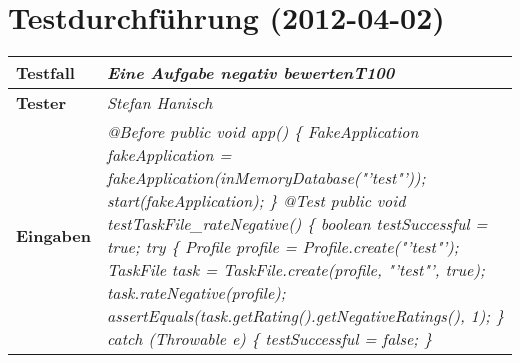 
\chapter{Testdurchführung (2012-04-02)}



\begin{longtable}{|p{4cm}|p{11cm}|}
\hline
\textbf{Testfall} & \textit{Eine Aufgabe negativ bewerten\textbf{T100}} \\
\hline
\textbf{Tester} & \textit{Stefan Hanisch} \\
\hline
\textbf{Eingaben} & \textit{@Before \newline
public void app() \{ \newline
\hspace*{1mm}FakeApplication fakeApplication \newline
\hspace*{4mm}= fakeApplication(inMemoryDatabase("'test"'));\newline
\hspace*{1mm}start(fakeApplication); \newline
\} \newline
\newline
@Test \newline
public void testTaskFile\_rateNegative() \{\newline
\hspace*{1mm}boolean testSuccessful = true; \newline
\hspace*{1mm}try \{\newline
\hspace*{3mm}Profile profile = Profile.create("'test"');\newline
\hspace*{3mm}TaskFile task = TaskFile.create(profile, "'test"', true);\newline
\hspace*{3mm}task.rateNegative(profile);\newline
\hspace*{3mm}assertEquals(task.getRating().getNegativeRatings(), 1);\newline
\hspace*{1mm}\} catch (Throwable e) \{ \newline
\hspace*{3mm}testSuccessful = false; \newline 
\hspace*{1mm}\} \newline
}
\end{longtable}
